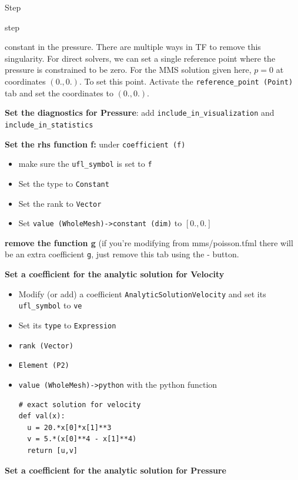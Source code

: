 \begin{steps}{Step}
\begin{steps}{step}
\begin{itemize}
        constant in the pressure.  There are multiple ways in TF to
        remove this singularity.  For direct solvers, we can set  a single reference
        point where the pressure is constrained to be zero. For
        the MMS solution given here, $p=0$ at coordinates $(0.,0.)$.
        To set this point.  Activate the \texttt{reference\_point
          (Point)} tab and set the coordinates to $(0.,0.)$.
      \end{itemize}
  \item \textbf{Set the diagnostics for Pressure}: add \texttt{include\_in\_visualization} and \texttt{include\_in\_statistics}
  \item \textbf{Set the rhs function f:} under \texttt{coefficient (f)}
    \begin{itemize}
    \item make sure the \texttt{ufl\_symbol} is set to \texttt{f}
    \item Set the type to \texttt{Constant}
    \item Set the rank to \texttt{Vector}
    \item Set \texttt{value (WholeMesh)->constant (dim)} to $[0.,0.]$
    \end{itemize}
  \item \textbf{remove the function g} (if you're modifying from
    mms/poisson.tfml there will be an extra coefficient \texttt{g},
    just remove this tab using the - button.
  \item \textbf{Set a coefficient for the analytic solution for Velocity}
    \begin{itemize}
    \item Modify (or add) a coefficient
      \texttt{AnalyticSolutionVelocity} and set its
      \texttt{ufl\_symbol} to \texttt{ve}
    \item Set its \texttt{type} to \texttt{Expression}
    \item \texttt{rank (Vector)}
    \item \texttt{Element (P2)}
    \item \texttt{value (WholeMesh)->python} with the python function
      \begin{lstlisting}[style=Python]
# exact solution for velocity
def val(x):
  u = 20.*x[0]*x[1]**3
  v = 5.*(x[0]**4 - x[1]**4)
  return [u,v]
      \end{lstlisting}
    \end{itemize}
 \item \textbf{Set a coefficient for the analytic solution for Pressure}
    \begin{itemize}

\end{itemize}
\end{steps}
\end{steps}

